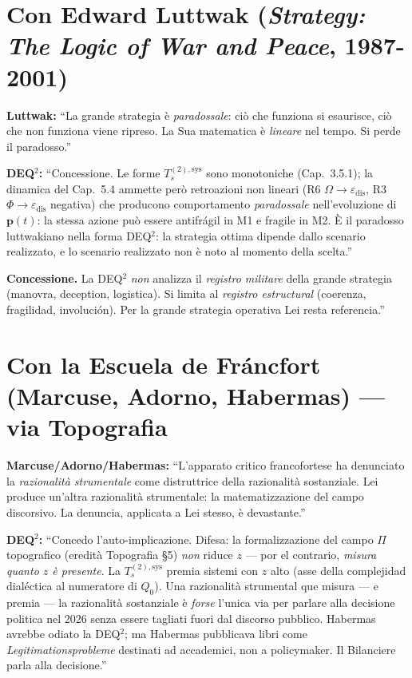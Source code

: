 \section{\texorpdfstring{Con Edward Luttwak (\emph{Strategy: The Logic
of War and Peace},
1987-2001)}{Con Edward Luttwak (Strategy: The Logic of War and Peace, 1987-2001)}}\label{con-edward-luttwak-strategy-the-logic-of-war-and-peace-1987-2001}

\textbf{Luttwak:} ``La grande strategia è \emph{paradossale}: ciò che
funziona si esaurisce, ciò che non funziona viene ripreso. La Sua
matematica è \emph{lineare} nel tempo. Si perde il paradosso.''

\textbf{DEQ$^2$:} ``Concessione. Le forme \(T_s^{(2),\text{sys}}\) sono
monotoniche (Cap.~3.5.1); la dinamica del Cap.~5.4 ammette però
retroazioni non lineari (R6 \(\Omega \to \varepsilon_{\text{dis}}\), R3
\(\Phi \to \varepsilon_{\text{dis}}\) negativa) che producono
comportamento \emph{paradossale} nell'evoluzione di
\(\boldsymbol{p}(t)\): la stessa azione può essere antifrágil in M1 e
fragile in M2. È il paradosso luttwakiano nella forma DEQ$^2$: la strategia
ottima dipende dallo scenario realizzato, e lo scenario realizzato non è
noto al momento della scelta.''

\textbf{Concessione.} La DEQ$^2$ \emph{non} analizza il \emph{registro
militare} della grande strategia (manovra, deception, logistica). Si
limita al \emph{registro estructural} (coerenza, fragilidad,
involución). Per la grande strategia operativa Lei resta referencia.''



\section{Con la Escuela de Fráncfort (Marcuse, Adorno, Habermas) ---
via
Topografia}\label{con-la-scuola-di-francoforte-marcuse-adorno-habermas-via-topografia}

\textbf{Marcuse/Adorno/Habermas:} ``L'apparato critico francofortese ha
denunciato la \emph{razionalità strumentale} come distruttrice della
razionalità sostanziale. Lei produce un'altra razionalità strumentale:
la matematizzazione del campo discorsivo. La denuncia, applicata a Lei
stesso, è devastante.''

\textbf{DEQ$^2$:} ``Concedo l'auto-implicazione. Difesa: la formalizzazione
del campo \(\Pi\) topografico (eredità Topografia \S{}5) \emph{non} riduce
\(z\) --- por el contrario, \emph{misura quanto \(z\) è presente}. La
\(T_s^{(2),\text{sys}}\) premia sistemi con \(z\) alto (asse della
complejidad dialéctica al numeratore di \(Q_0\)). Una razionalità
strumental que misura --- e premia --- la razionalità sostanziale è
\emph{forse} l'unica via per parlare alla decisione politica nel 2026
senza essere tagliati fuori dal discorso pubblico. Habermas avrebbe
odiato la DEQ$^2$; ma Habermas pubblicava libri come
\emph{Legitimationsprobleme} destinati ad accademici, non a policymaker.
Il Bilanciere parla alla decisione.''


